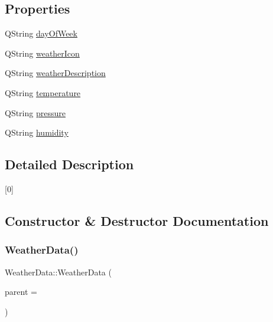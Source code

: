 \subsection*{Properties}
\begin{DoxyCompactItemize}
\item 
Q\+String \hyperlink{class_weather_data_a483043396f44ae957716ebb005644d0d}{day\+Of\+Week}
\item 
Q\+String \hyperlink{class_weather_data_aca04e1877e2d5bc6da0f1e9910553741}{weather\+Icon}
\item 
Q\+String \hyperlink{class_weather_data_a8b470bc177e317a6a6a6b51758724a1a}{weather\+Description}
\item 
Q\+String \hyperlink{class_weather_data_a2ee510e51cb81a6a479cd0af5f291e2c}{temperature}
\item 
Q\+String \hyperlink{class_weather_data_a2529c61089c163abf0e2dd80a51c47cb}{pressure}
\item 
Q\+String \hyperlink{class_weather_data_acf762ef73e6056b6cc8716e1aa1c7220}{humidity}
\end{DoxyCompactItemize}


\subsection{Detailed Description}
\mbox{[}0\mbox{]} 

\subsection{Constructor \& Destructor Documentation}
\mbox{\label{class_weather_data_aae42655299392d3f90feec9911a2dd60}} 
\subsubsection{\texorpdfstring{Weather\+Data()}{WeatherData()}\hspace{0.1cm}{\footnotesize\ttfamily [1/2]}}
{\footnotesize\ttfamily Weather\+Data\+::\+Weather\+Data (\begin{DoxyParamCaption}\item[{Q\+Object $\ast$}]{parent = {} }\end{DoxyParamCaption})\hspace{0.3cm}{\ttfamily [explicit]}}

